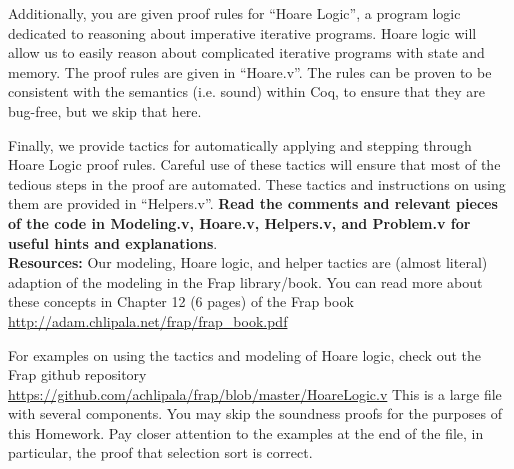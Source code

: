 \documentclass{article}
\begin{document}
Additionally, you are given proof rules for ``Hoare Logic'', a program logic dedicated to reasoning about
imperative iterative programs. Hoare logic will allow us to easily reason about complicated iterative programs
with state and memory. The proof rules are given in ``Hoare.v''. The rules can be proven to be consistent with
the semantics  (i.e. sound) within Coq, to ensure that they are bug-free, but we skip that here.

Finally, we provide tactics for automatically applying and stepping through Hoare Logic proof rules. Careful
use of these tactics will ensure that most of the tedious steps in the proof are automated. These tactics and
instructions on using them are provided in ``Helpers.v''. \textbf{Read the comments and relevant pieces of the code
in Modeling.v, Hoare.v, Helpers.v, and Problem.v for useful hints and explanations}. \\

\textbf{Resources:} Our modeling, Hoare logic, and helper tactics are (almost literal) adaption of the modeling
in the Frap library/book. You can read more about these concepts in Chapter 12 (6 pages) of the Frap book
\href{http://adam.chlipala.net/frap/frap\_book.pdf}{http://adam.chlipala.net/frap/frap\_book.pdf}

For examples on using the tactics and modeling of Hoare logic, check out the Frap github repository
\href{https://github.com/achlipala/frap/blob/master/HoareLogic.v}{https://github.com/achlipala/frap/blob/master/HoareLogic.v}
This is a large file with several components. You may skip the soundness proofs for the purposes of this Homework. Pay
closer attention to the examples at the end of the file, in particular, the proof that selection sort is correct. \\
\end{document}
